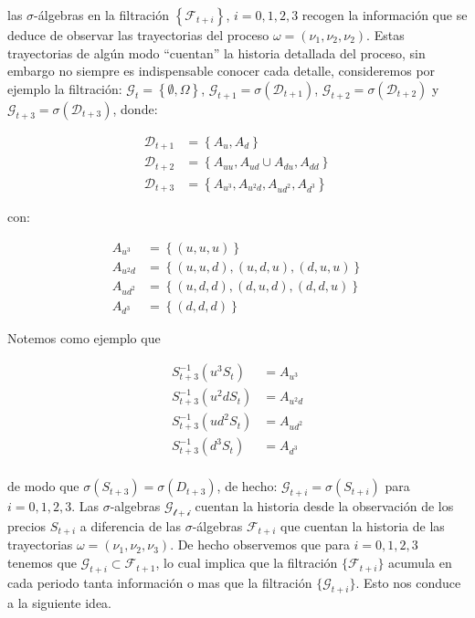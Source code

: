 \documentclass{extreport}
\theoremstyle{definicion}
\theoremstyle{propiedad}
\theoremstyle{teorema}
\begin{document}
las $\sigma$-álgebras en la filtración $\left\{\mathcal{F}_{t+i}\right\}$, $i=0,1,2,3$ recogen la información que se deduce de observar las trayectorias del proceso $\omega = (\nu_1, \nu_2, \nu_2)$.  Estas trayectorias de algún modo “cuentan” la historia detallada del proceso, sin embargo no siempre es indispensable conocer cada detalle, consideremos por ejemplo la filtración: $\mathcal{G}_t = \left\{\emptyset, \Omega\right\}$, $\mathcal{G}_{t+1} = \sigma(\mathcal{D}_{t+1})$, $\mathcal{G}_{t+2} = \sigma(\mathcal{D}_{t+2})$ y $\mathcal{G}_{t+3} = \sigma(\mathcal{D}_{t+3})$, donde:


\begin{align*}
\mathcal{D}_{t+1} & = \left\{A_u, A_d\right\}\\
\mathcal{D}_{t+2} & = \left\{A_{uu}, A_{ud}\cup A_{du}, A_{dd}\right\}\\
\mathcal{D}_{t+3}&  = \left\{A_{u^3}, A_{u^2d}, A_{ud^2}, A_{d^3}\right\}
\end{align*}


con:


\begin{align*}
A_{u^3} & = \left\{(u,u,u)\right\}\\
A_{u^2d} & = \left\{(u,u,d),(u,d,u),(d,u,u)\right\}\\ 
A_{ud^2} & = \left\{(u,d,d),(d,u,d), (d,d,u)\right\} \\
A_{d^3} & = \left\{(d,d,d)\right\}
\end{align*}


Notemos como ejemplo que 


\begin{align*}
S_{t+3}^{-1}(u^3S_t) & = A_{u^3}\\
S_{t+3}^{-1}(u^2dS_t) & = A_{u^2d}\\
S_{t+3}^{-1}(ud^2S_t) & = A_{ud^2}\\
S_{t+3}^{-1}(d^3S_t) & = A_{d^3}\\ 
\end{align*}


de modo que  $\sigma(S_{t+3}) = \sigma(D_{t+3})$, de hecho: $\mathcal{G}_{t+i} = \sigma(S_{t+i})$ para $i = 0,1,2,3$. Las $\sigma$-algebras $\mathcal{G_{t+i}}$ cuentan la historia desde la observación de los precios $S_{t+i}$ a diferencia  de las $\sigma$-álgebras $\mathcal{F}_{t+i}$ que cuentan la historia de las trayectorias $\omega = (\nu_1, \nu_2, \nu_3)$. De hecho observemos que para $i= 0, 1, 2,3$ tenemos que $\mathcal{G}_{t+i}\subset\mathcal{F}_{t+1}$, lo cual implica que la filtración $\{\mathcal{F}_{t+i}\}$ acumula en cada periodo tanta información o mas que la filtración $\{\mathcal{G}_{t+i}\}$. Esto nos conduce a la siguiente idea.
\end{document}
